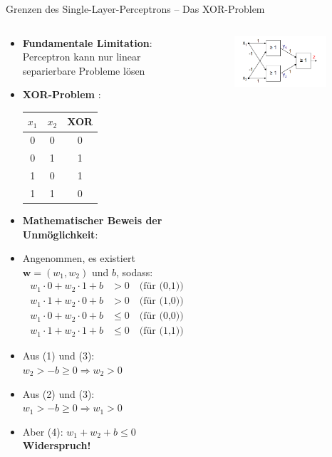 \documentclass[aspectratio=1610, xcolor=dvipsnames, 9pt]{beamer}
\begin{document}
\begin{frame}{Grenzen des Single-Layer-Perceptrons -- Das XOR-Problem}
  \begin{columns}
    \begin{column}{0.6\textwidth}
      \begin{itemize}
        \item \textbf{Fundamentale Limitation}: Perceptron kann nur linear separierbare Probleme lösen
        \item \textbf{XOR-Problem} \cite{minsky1969}: 
        \begin{center}
        \begin{tabular}{|c|c|c|}
        \hline
        $x_1$ & $x_2$ & XOR \\
        \hline
        0 & 0 & 0 \\
        0 & 1 & 1 \\
        1 & 0 & 1 \\
        1 & 1 & 0 \\
        \hline
        \end{tabular}
        \end{center}
        \item \textbf{Mathematischer Beweis der Unmöglichkeit}: 
        \item Angenommen, es existiert $\mathbf{w} = (w_1, w_2)$ und $b$, sodass:
        \begin{align}
          w_1 \cdot 0 + w_2 \cdot 1 + b &> 0 \quad \text{(für (0,1))} \\
          w_1 \cdot 1 + w_2 \cdot 0 + b &> 0 \quad \text{(für (1,0))} \\
          w_1 \cdot 0 + w_2 \cdot 0 + b &\leq 0 \quad \text{(für (0,0))} \\
          w_1 \cdot 1 + w_2 \cdot 1 + b &\leq 0 \quad \text{(für (1,1))}
        \end{align}
        \item Aus (1) und (3): $w_2 > -b \geq 0 \Rightarrow w_2 > 0$
        \item Aus (2) und (3): $w_1 > -b \geq 0 \Rightarrow w_1 > 0$
        \item Aber (4): $w_1 + w_2 + b \leq 0$ \textbf{Widerspruch!}
      \end{itemize}
    \end{column}
    \begin{column}{0.4\textwidth}
      \begin{figure}
        \centering
                    \includegraphics[width=0.9\textwidth]{images/XOR.png}

\end{figure}
\end{column}
\end{columns}
\end{frame}
\end{document}
